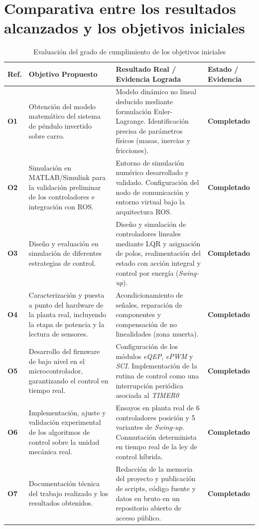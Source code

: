 \documentclass[11pt,fleqn]{book} %
\begin{document}
\newpage 
\section{Comparativa entre los resultados alcanzados y los objetivos iniciales}
\label{sec:comparativa_objetivos}

\begin{table}[!htbp]
	\centering
	\caption{Evaluación del grado de cumplimiento de los objetivos iniciales}
	\label{tab:cumplimiento_objetivos}
	\begin{tabularx}{\textwidth}{>{\centering\arraybackslash}m{1.2cm} >{\raggedright\arraybackslash}X >{\raggedright\arraybackslash}X >{\centering\arraybackslash}m{2.5cm}}
		\toprule
		\textbf{Ref.} & \textbf{Objetivo Propuesto} & \textbf{Resultado Real / Evidencia Lograda} & \textbf{Estado / Evidencia} \\ 
		\midrule
		\textbf{O1} & Obtención del modelo matemático del sistema de péndulo invertido sobre carro. & Modelo dinámico no lineal deducido mediante formulación Euler-Lagrange. Identificación precisa de parámetros físicos (masas, inercias y fricciones). & \textbf{Completado} \\ \addlinespace
		\textbf{O2} & Simulación en MATLAB/Simulink para la validación preliminar de los controladores e integración con ROS. & Entorno de simulación numérico desarrollado y validado. Configuración del nodo de comunicación y entorno virtual bajo la arquitectura ROS. & \textbf{Completado} \\ \addlinespace
		\textbf{O3} & Diseño y evaluación en simulación de diferentes estrategias de control. & Diseño y simulación de controladores lineales mediante LQR y asignación de polos, realimentación del estado con acción integral y control por energía (\textit{Swing-up}). & \textbf{Completado} \\ \addlinespace
		\textbf{O4} & Caracterización y puesta a punto del hardware de la planta real, incluyendo la etapa de potencia y la lectura de sensores. & Acondicionamiento de señales, reparación de componentes y compensación de no linealidades (zona muerta). & \textbf{Completado} \\ \addlinespace
		\textbf{O5} & Desarrollo del firmware de bajo nivel en el microcontrolador, garantizando el control en tiempo real. & Configuración de los módulos \textit{eQEP}, \textit{ePWM} y \textit{SCI}. Implementación de la rutina de control como una interrupción periódica asociada al \textit{TIMER0} & \textbf{Completado} \\ \addlinespace
		\textbf{O6} & Implementación, ajuste y validación experimental de los algoritmos de control sobre la unidad mecánica real. & Ensayos en planta real de 6 controladores posición y 5 variantes de \textit{Swing-up}. Conmutación determinista en tiempo real de la ley de control híbrida. & \textbf{Completado} \\ \addlinespace
		\textbf{O7} & Documentación técnica del trabajo realizado y los resultados obtenidos. & Redacción de la memoria del proyecto y publicación de scripts, código fuente y datos en bruto en un repositorio abierto de acceso público. & \textbf{Completado} \\
		\bottomrule
	\end{tabularx}
\end{table}
\end{document}
